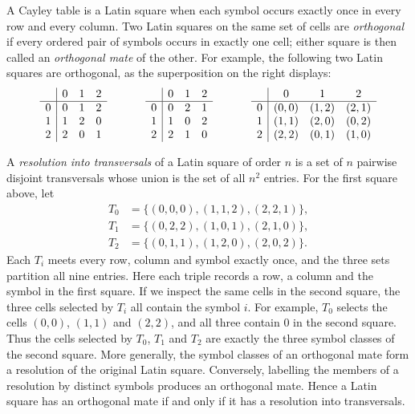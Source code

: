 \documentclass[11pt]{article}
\theoremstyle{plain}
\theoremstyle{remark}
\theoremstyle{definition}
\theoremstyle{plain}
\begin{document}
A Cayley table is a Latin square when each symbol occurs exactly once in
every row and every column. Two Latin squares on the same set of cells are
\emph{orthogonal} if every ordered pair of  symbols occurs in exactly one cell;
either square is then called an \emph{orthogonal mate} of the other. For
example, the following two Latin squares are orthogonal, as the superposition
on the right displays:
\[
\begin{array}{c@{\hspace{1.2cm}}c@{\hspace{1.2cm}}c}
\begin{array}{c|ccc}
 &0&1&2\\ \hline
0&0&1&2\\
1&1&2&0\\
2&2&0&1
\end{array}
&
\begin{array}{c|ccc}
 &0&1&2\\ \hline
0&0&2&1\\
1&1&0&2\\
2&2&1&0
\end{array}
&
\begin{array}{c|ccc}
 &0&1&2\\ \hline
0&(0,0)&(1,2)&(2,1)\\
1&(1,1)&(2,0)&(0,2)\\
2&(2,2)&(0,1)&(1,0)
\end{array}
\end{array}
\]

A \emph{resolution into transversals} of a Latin square of order $n$ is a set
of $n$ pairwise disjoint transversals whose union is the set of all $n^2$
entries. For the first square above, let
\[
\begin{aligned}
T_0&=\{(0,0,0),(1,1,2),(2,2,1)\},\\
T_1&=\{(0,2,2),(1,0,1),(2,1,0)\},\\
T_2&=\{(0,1,1),(1,2,0),(2,0,2)\}.
\end{aligned}
\]
Each $T_i$ meets every row, column and symbol exactly once, and the three
sets partition all nine entries. Here each triple records a row, a column and
the symbol in the first square. If we inspect the same cells in the second
square, the three cells selected by $T_i$ all contain the symbol $i$. For
example, $T_0$ selects the cells $(0,0)$, $(1,1)$ and $(2,2)$, and all three
contain $0$ in the second square. Thus the cells selected by $T_0$, $T_1$ and
$T_2$ are exactly the three symbol classes of the second square.
More generally, the symbol classes of an orthogonal mate form a resolution
of the original Latin square. Conversely, labelling the members of a
resolution by distinct symbols produces an orthogonal mate. Hence a Latin
square has an orthogonal mate if and only if it has a resolution into
transversals.
\end{document}

